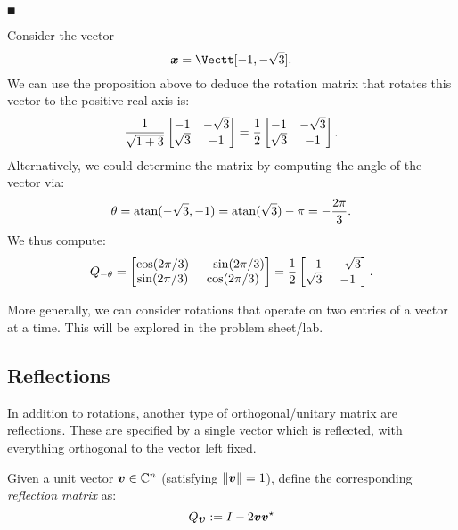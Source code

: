 \ensuremath{\QED}

\begin{example} Consider the vector
\[
\ensuremath{\bm{\x}} = \Vectt[-1,-\sqrt{3}].
\]
We can use the proposition above to deduce the rotation matrix that rotates this vector to the positive real axis is:
\[
{1 \over \sqrt{1+3}} \begin{bmatrix} -1 & -\sqrt{3} \\ \sqrt{3} & -1 \end{bmatrix} = 
{1 \over 2} \begin{bmatrix} -1 & -\sqrt{3} \\ \sqrt{3} & -1 \end{bmatrix}.
\]
Alternatively, we could determine the matrix by computing the angle of the vector via:
\[
\ensuremath{\theta} =  {\rm atan}(-\sqrt{3}, -1) = {\rm atan}(\sqrt{3}) - \ensuremath{\pi} = -{2\ensuremath{\pi} \over 3}.
\]
We thus compute:
\[
Q_{-\ensuremath{\theta}} = \begin{bmatrix}
\cos(2\ensuremath{\pi}/3) & -\sin(2\ensuremath{\pi}/3) \\
\sin(2\ensuremath{\pi}/3) & \cos(2\ensuremath{\pi}/3)
\end{bmatrix} = {1 \over 2} \begin{bmatrix} -1 & -\sqrt{3} \\ \sqrt{3} & -1 \end{bmatrix}.
\]
\end{example}

More generally, we can consider rotations that operate on two entries of a vector at a time. This will be explored in the problem sheet/lab.

\subsection{Reflections}
In addition to rotations, another type of orthogonal/unitary matrix are reflections. These are specified by a single vector which is reflected, with everything orthogonal to the vector left fixed. 

\begin{definition}  Given a unit vector $\bm{{\mbox{\boldmath$v$\unboldmath}}} \in {\mathbb C}^n$ (satisfying $\|\bm{{\mbox{\boldmath$v$\unboldmath}}}\|=1$), define the corresponding \emph{reflection matrix} as:
\[
Q_{\bm{{\mbox{\boldmath$v$\unboldmath}}}} := I - 2 \bm{{\mbox{\boldmath$v$\unboldmath}}} \bm{{\mbox{\boldmath$v$\unboldmath}}}^\star
\]
\end{definition}

